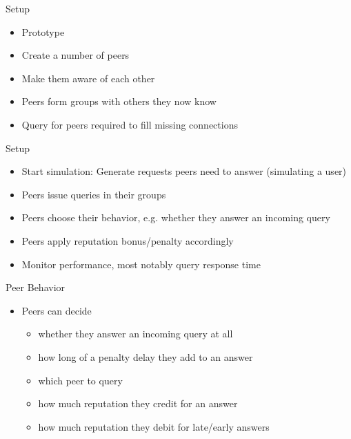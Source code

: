 \documentclass[presentation,english,usenames,dvipsnames]{beamer}
\begin{document}
\begin{frame}{Setup}
  \begin{itemize}
    \item Prototype
    \item Create a number of peers
    \item Make them aware of each other
    \item Peers form groups with others they now know
    \item Query for peers required to fill missing connections
  \end{itemize}
\end{frame}

\begin{frame}{Setup}
  \begin{itemize}
    \item Start simulation: Generate requests peers need to answer (simulating a
          user)
    \item Peers issue queries in their groups
    \item Peers choose their behavior, e.g. whether they answer an incoming
          query
    \item Peers apply reputation bonus/penalty accordingly
    \item Monitor performance, most notably query response time
  \end{itemize}
\end{frame}

\begin{frame}{Peer Behavior}
  \begin{itemize}
    \item Peers can decide
    \begin{itemize}
      \item whether they answer an incoming query at all
      \item how long of a penalty delay they add to an answer
      \item which peer to query
      \item how much reputation they credit for an answer
      \item how much reputation they debit for late/early answers
    \end{itemize}
  \end{itemize}
\end{frame}
\end{document}
